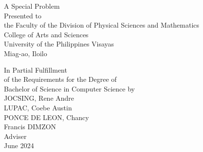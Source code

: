 \begin{titlepage}
\centering


\vspace{1.15cm}
A Special Problem\\
Presented to\\
the Faculty of the Division of Physical Sciences and Mathematics\\
College of Arts and Sciences\\
University of the Philippines Visayas\\
Miag-ao, Iloilo

\vspace{1.15cm}
In Partial Fulfillment\\
of the Requirements for the Degree of\\
Bachelor of Science in Computer Science
\vspace{1.15cm}
by\\

\vspace{1cm}
JOCSING, Rene Andre  \\
LUPAC, Coebe Austin  \\
PONCE DE LEON, Chancy  \\

\vspace{1.15cm}
Francis DIMZON \\
Adviser\\

\vspace{1.15cm}
June 2024
\end{titlepage}
